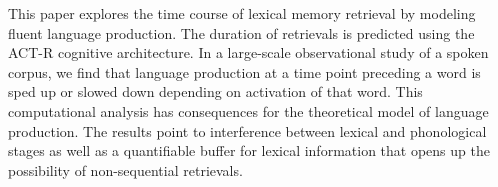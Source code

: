 This paper explores the time course of lexical memory retrieval by modeling fluent language production. The duration of retrievals is predicted using the ACT-R cognitive architecture. In a large-scale observational study of a spoken corpus, we find that language production at a time point preceding a word is sped up or slowed down depending on activation of that word. This computational analysis has consequences for the theoretical model of language production. The results point to interference between lexical and phonological stages as well as a quantifiable buffer for lexical information that opens up the possibility of non-sequential retrievals.
